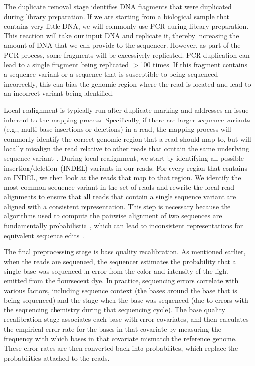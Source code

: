 \documentclass[phd]{ucbthesis}
\begin{document}
The duplicate removal stage identifies DNA fragments that were duplicated during
library preparation. If we are starting from a biological sample that contains
very little DNA, we will commonly use PCR during
library preparation. This reaction will take our input DNA and replicate it,
thereby increasing the amount of DNA that we can provide to the sequencer.
However, as part of the PCR process, some fragments will be excessively
replicated. PCR duplication can lead to a single fragment being replicated $>$100 times. If
this fragment contains a sequence variant or a sequence that is susceptible to
being sequenced incorrectly, this can bias the genomic region where the read is
located and lead to an incorrect variant being identified.

Local realignment is typically run after duplicate marking and addresses an
issue inherent to the mapping process. Specifically, if there are larger
sequence variants (e.g., multi-base insertions or deletions) in a read, the
mapping process will commonly identify the correct genomic region that a read
should map to, but will locally misalign the read relative to other reads that
contain the same underlying sequence variant~\cite{depristo11}. During local
realignment, we start by identifying all possible insertion/deletion~(INDEL)
variants in our reads. For every region that contains an INDEL, we then look
at the reads that map to that region. We identify the most common sequence
variant in the set of reads and rewrite the local read alignments to ensure that
all reads that contain a single sequence variant are aligned with a consistent
representation. This step is necessary because the algorithms used to compute
the pairwise alignment of two sequences are fundamentally
probabilistic~\cite{durbin98, smith81, ukkonen85}, which can lead to
inconsistent representations for equivalent sequence edits~\cite{li14}.

The final preprocessing stage is base quality recalibration. As mentioned
earlier, when the reads are sequenced, the sequencer estimates the probability
that a single base was sequenced in error from the color and intensity of the
light emitted from the floursecent dye. In practice, sequencing errors correlate
with various factors, including sequence context (the bases around the base that
is being sequenced) and the stage when the base was sequenced (due to errors
with the sequencing chemistry during that sequencing cycle). The base quality
recalibration stage associates each base with error covariates, and then
calculates the empirical error rate for the bases in that covariate by measuring
the frequency with which bases in that covariate mismatch the reference genome.
These error rates are then converted back into probabilites, which replace the
probabilities attached to the reads.
\end{document}

